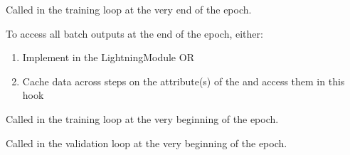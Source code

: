 \documentclass[letterpaper,10pt,english]{sphinxmanual}
\begin{document}
\begin{fulllineitems}
\begin{fulllineitems}
\label{\detokenize{pages/ml:vipercore.ml.plmodels.AutoEncoderModel.on_train_epoch_end}}
\sphinxAtStartPar
Called in the training loop at the very end of the epoch.

\sphinxAtStartPar
To access all batch outputs at the end of the epoch, either:
\begin{enumerate}
%
\item {} 
\sphinxAtStartPar
Implement  in the LightningModule OR

\item {} 
\sphinxAtStartPar
Cache data across steps on the attribute(s) of the  and access them in this hook

\end{enumerate}

\end{fulllineitems}


\begin{fulllineitems}
\label{\detokenize{pages/ml:vipercore.ml.plmodels.AutoEncoderModel.on_train_epoch_start}}
\sphinxAtStartPar
Called in the training loop at the very beginning of the epoch.

\end{fulllineitems}


\begin{fulllineitems}
\label{\detokenize{pages/ml:vipercore.ml.plmodels.AutoEncoderModel.on_validation_epoch_start}}
\sphinxAtStartPar
Called in the validation loop at the very beginning of the epoch.

\end{fulllineitems}



\end{fulllineitems}
\end{document}
